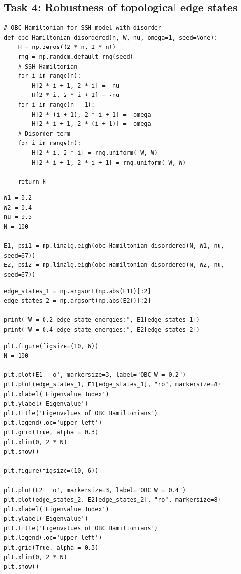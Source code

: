 \documentclass{report}
\begin{document}
\subsection*{Task 4: Robustness of topological edge states}

\begin{lstlisting}
# OBC Hamiltonian for SSH model with disorder
def obc_Hamiltonian_disordered(n, W, nu, omega=1, seed=None):
    H = np.zeros((2 * n, 2 * n))
    rng = np.random.default_rng(seed)
    # SSH Hamiltonian
    for i in range(n):
        H[2 * i + 1, 2 * i] = -nu
        H[2 * i, 2 * i + 1] = -nu
    for i in range(n - 1):
        H[2 * (i + 1), 2 * i + 1] = -omega
        H[2 * i + 1, 2 * (i + 1)] = -omega
    # Disorder term
    for i in range(n):
        H[2 * i, 2 * i] = rng.uniform(-W, W)
        H[2 * i + 1, 2 * i + 1] = rng.uniform(-W, W)

    return H
\end{lstlisting}

\begin{lstlisting}
W1 = 0.2
W2 = 0.4
nu = 0.5
N = 100

E1, psi1 = np.linalg.eigh(obc_Hamiltonian_disordered(N, W1, nu, seed=67))
E2, psi2 = np.linalg.eigh(obc_Hamiltonian_disordered(N, W2, nu, seed=67))
\end{lstlisting}

\begin{lstlisting}
edge_states_1 = np.argsort(np.abs(E1))[:2]
edge_states_2 = np.argsort(np.abs(E2))[:2]

print("W = 0.2 edge state energies:", E1[edge_states_1])
print("W = 0.4 edge state energies:", E2[edge_states_2])
\end{lstlisting}

\begin{lstlisting}
plt.figure(figsize=(10, 6))
N = 100

plt.plot(E1, 'o', markersize=3, label="OBC W = 0.2")
plt.plot(edge_states_1, E1[edge_states_1], "ro", markersize=8)
plt.xlabel('Eigenvalue Index')
plt.ylabel('Eigenvalue')
plt.title('Eigenvalues of OBC Hamiltonians')
plt.legend(loc='upper left')
plt.grid(True, alpha = 0.3)
plt.xlim(0, 2 * N)
plt.show()

plt.figure(figsize=(10, 6))

plt.plot(E2, 'o', markersize=3, label="OBC W = 0.4")
plt.plot(edge_states_2, E2[edge_states_2], "ro", markersize=8)
plt.xlabel('Eigenvalue Index')
plt.ylabel('Eigenvalue')
plt.title('Eigenvalues of OBC Hamiltonians')
plt.legend(loc='upper left')
plt.grid(True, alpha = 0.3)
plt.xlim(0, 2 * N)
plt.show()
\end{lstlisting}
\end{document}
